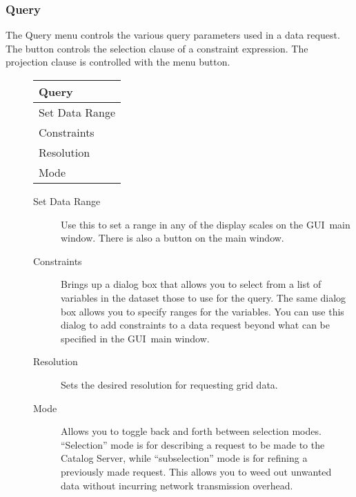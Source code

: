 \documentclass[10pt]{report}
\newcommand{\cs}{Catalog Server}
\newcommand{\gui}{GUI}
\begin{document}
\subsubsection{Query}
\label{sec:menu:query}
The Query menu controls the various query parameters used in a
data request.  The  button controls the selection
clause of a constraint expression.  The projection clause is
controlled with the  menu button.
\begin{description}
\item[] 
  \begin{center}
    \begin{tabular}[c]{|l|} \hline
      \textbf{Query} \\ \hline
      Set Data Range \\
      Constraints \\ 
      Resolution \\
      Mode \\ \hline
    \end{tabular}
  \end{center}
  \begin{description}
  \item[Set Data Range] Use this to set a range in any of the display
    scales on the \gui\ main window.  There is also a  button on the main window.
  \item[Constraints] Brings up a dialog box that allows you to select
    from a list of variables in the dataset those to use for the
    query. The same dialog box allows you to specify ranges for the
    variables.  You can use this dialog to add constraints to a data
    request beyond what can be specified in the \gui\ main window.
  \item[Resolution] Sets the desired resolution for requesting grid
    data. 
  \item[Mode] Allows you to toggle back and forth between selection
    modes.  ``Selection'' mode is for describing a request to be made
    to the \cs , while ``subselection'' mode is for refining a
    previously made request.  This allows you to weed out unwanted
    data without incurring network transmission overhead.
  \end{description}
\end{description}
\end{document}
